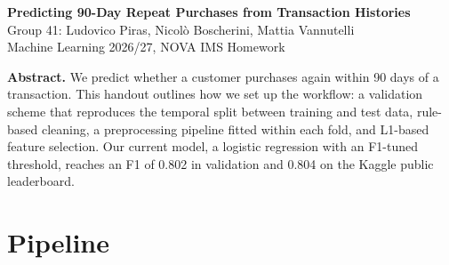 \documentclass[10pt,a4paper]{article}
\begin{document}
\begin{center}
{\Large\bfseries Predicting 90-Day Repeat Purchases from Transaction Histories}\\[8pt]
{\normalsize Group 41: Ludovico Piras, Nicolò Boscherini, Mattia Vannutelli}\\[2pt]
{\small Machine Learning 2026/27, NOVA IMS \textemdash{} Homework}
\end{center}

\begin{center}
\begin{minipage}{0.86\linewidth}
\small\textbf{Abstract.} We predict whether a customer purchases again within 90 days of a transaction. This handout outlines how we set up the workflow: a validation scheme that reproduces the temporal split between training and test data, rule-based cleaning, a preprocessing pipeline fitted within each fold, and L1-based feature selection. Our current model, a logistic regression with an F1-tuned threshold, reaches an F1 of 0.802 in validation and 0.804 on the Kaggle public leaderboard.
\end{minipage}
\end{center}

\section{Pipeline}
\end{document}
